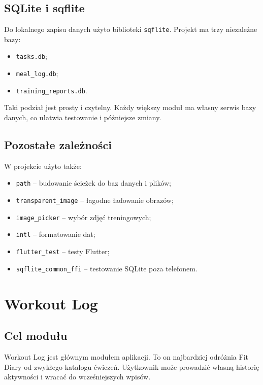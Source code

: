 \documentclass[12pt,a4paper]{article}
\begin{document}
\subsection{SQLite i sqflite}

Do lokalnego zapisu danych użyto biblioteki \texttt{sqflite}. Projekt ma trzy niezależne bazy:

\begin{itemize}
    \item \texttt{tasks.db};
    \item \texttt{meal\_log.db};
    \item \texttt{training\_reports.db}.
\end{itemize}

Taki podział jest prosty i czytelny. Każdy większy moduł ma własny serwis bazy danych, co ułatwia testowanie i późniejsze zmiany.

\subsection{Pozostałe zależności}

W projekcie użyto także:

\begin{itemize}
    \item \texttt{path} -- budowanie ścieżek do baz danych i plików;
    \item \texttt{transparent\_image} -- łagodne ładowanie obrazów;
    \item \texttt{image\_picker} -- wybór zdjęć treningowych;
    \item \texttt{intl} -- formatowanie dat;
    \item \texttt{flutter\_test} -- testy Flutter;
    \item \texttt{sqflite\_common\_ffi} -- testowanie SQLite poza telefonem.
\end{itemize}

\section{Workout Log}

\subsection{Cel modułu}

Workout Log jest głównym modułem aplikacji. To on najbardziej odróżnia Fit Diary od zwykłego katalogu ćwiczeń. Użytkownik może prowadzić własną historię aktywności i wracać do wcześniejszych wpisów.
\end{document}
